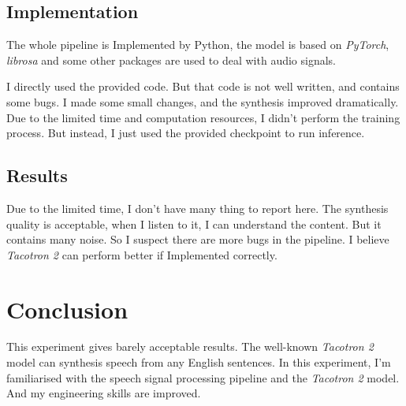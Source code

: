 \documentclass[journal, a4paper]{IEEEtran}
\begin{document}
\subsection{Implementation}

The whole pipeline is Implemented by Python, the model is based on \emph{PyTorch}, \emph{librosa} and some other packages are used to deal with audio signals.

I directly used the provided code. But that code is not well written, and contains some bugs. I made some small changes, and the synthesis improved dramatically. Due to the limited time and computation resources, I didn't perform the training process. But instead, I just used the provided checkpoint to run inference.

\subsection{Results}

Due to the limited time, I don't have many thing to report here. The synthesis quality is acceptable, when I listen to it, I can understand the content. But it contains many noise. So I suspect there are more bugs in the pipeline. I believe \emph{Tacotron 2} can perform better if Implemented correctly.

\section{Conclusion}

This experiment gives barely acceptable results. The well-known \emph{Tacotron 2} model can synthesis speech from any English sentences. In this experiment, I'm familiarised with the speech signal processing pipeline and the \emph{Tacotron 2} model. And my engineering skills are improved.
\end{document}
